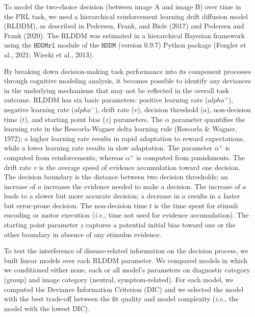 \documentclass[
  man,floatsintext]{apa6}
\begin{document}
To model the two-choice decision (between image A and image B) over time in the PRL task, we used a hierarchical reinforcement learning drift diffusion model (RLDDM), as described in Pedersen, Frank, and Biele (2017) and Pedersen and Frank (2020). The RLDDM was estimated in a hierarchical Bayesian framework using the \(\texttt{HDDMrl}\) module of the \(\texttt{HDDM}\) (version 0.9.7) Python package (Fengler et al., 2021; Wiecki et al., 2013).

By breaking down decision-making task performance into its component processes through cognitive modeling analysis, it becomes possible to identify any deviances in the underlying mechanisms that may not be reflected in the overall task outcome. RLDDM has six basic parameters: positive learning rate (\(alpha^+\)), negative learning rate (\(alpha^-\)), drift rate (\(v\)), decision threshold (\(a\)), non-decision time (\(t\)), and starting point bias (\(z\)) parameters. The \(\alpha\) parameter quantifies the learning rate in the Rescorla-Wagner delta learning rule (Rescorla \& Wagner, 1972); a higher learning rate results in rapid adaptation to reward expectations, while a lower learning rate results in slow adaptation. The parameter \(\alpha^+\) is computed from reinforcements, whereas \(\alpha^+\) is computed from punishments. The drift rate \(v\) is the average speed of evidence accumulation toward one decision. The decision boundary is the distance between two decision thresholds; an increase of \(a\) increases the evidence needed to make a decision. The increase of \(a\) leads to a slower but more accurate decision; a decrease in \(a\) results in a faster but error-prone decision. The non-decision time \(t\) is the time spent for stimuli encoding or motor execution (\emph{i.e.}, time not used for evidence accumulation). The starting point parameter \(z\) captures a potential initial bias toward one or the other boundary in absence of any stimulus evidence.

To test the interference of disease-related information on the decision process, we built linear models over each RLDDM parameter. We compared models in which we conditioned either none, each or all model's parameters on diagnostic category (group) and image category (neutral, symptom-related). For each model, we computed the Deviance Information Criterion (DIC) and we selected the model with the best trade-off between the fit quality and model complexity (\emph{i.e.}, the model with the lowest DIC).
\end{document}
